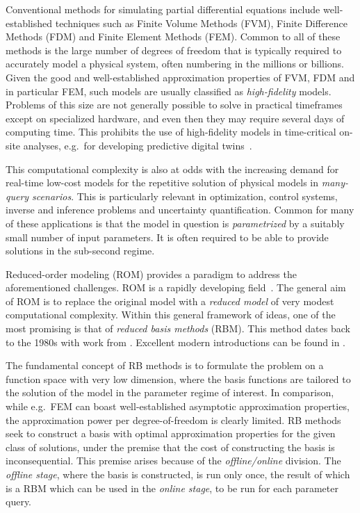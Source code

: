 \documentclass[a4paper]{jpconf}
\begin{document}
Conventional methods for simulating partial differential equations
include well-established techniques such as Finite Volume Methods
(FVM), Finite Difference Methods (FDM) and Finite Element Methods
(FEM).  Common to all of these methods is the large number of degrees
of freedom that is typically required to accurately model a physical
system, often numbering in the millions or billions. Given the good
and well-established approximation properties of FVM, FDM and in
particular FEM, such models are usually classified as
\emph{high-fidelity} models.  Problems of this size are not generally
possible to solve in practical timeframes except on specialized
hardware, and even then they may require several days of computing
time.  This prohibits the use of high-fidelity models in time-critical
on-site analyses, e.g.~for developing predictive digital
twins~\cite{Rasheed2020dtv}.

This computational complexity is also at odds with the increasing
demand for real-time low-cost models for the repetitive solution of
physical models in \emph{many-query scenarios}.  This is particularly
relevant in optimization, control systems, inverse and inference
problems and uncertainty quantification.  Common for many of these
applications is that the model in question is \emph{parametrized} by a
suitably small number of input parameters.  It is often required to be
able to provide solutions in the sub-second regime.

Reduced-order modeling (ROM) provides a paradigm to address the
aforementioned challenges.  ROM is a rapidly developing
field~\cite{Bazaz2012rpm}. The general aim of ROM is to replace the
original model with a \emph{reduced model} of very modest
computational complexity. Within this general framework of ideas, one
of the most promising is that of \emph{reduced basis methods}
(RBM). This method dates back to the 1980s with work from
\cite{Almroth1978acg,Almroth1981gfi,Nagy1979mrg,Noor1980rbt,Noor1981bpb,Noor1981rar,Noor1982mln}.
Excellent modern introductions can be found in
\cite{Quarteroni2016rbm,Haasdonk2017rbm}.

The fundamental concept of RB methods is to formulate the problem on a
function space with very low dimension, where the basis functions are
tailored to the solution of the model in the parameter regime of
interest.  In comparison, while e.g.~FEM can boast well-established
asymptotic approximation properties, the approximation power per
degree-of-freedom is clearly limited.  RB methods seek to construct a
basis with optimal approximation properties for the given class of
solutions, under the premise that the cost of constructing the basis
is inconsequential.  This premise arises because of the
\emph{offline/online} division.  The \emph{offline stage}, where the
basis is constructed, is run only once, the result of which is a RBM
which can be used in the \emph{online stage}, to be run for each
parameter query.
\end{document}
